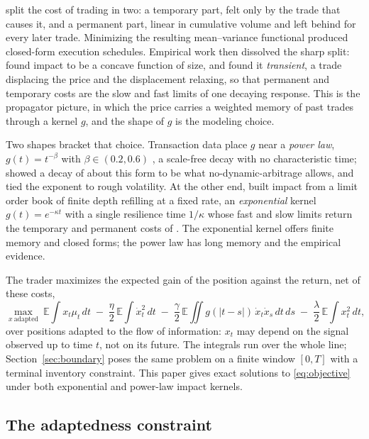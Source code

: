 \documentclass[11pt]{article}
\newcommand{\E}{\mathbb{E}}
\theoremstyle{plain}
\theoremstyle{definition}
\theoremstyle{remark}
\begin{document}
\citet{AlmgrenChriss2001} split the cost of trading in two: a temporary part, felt only by the trade that causes it, and a permanent part, linear in cumulative volume and left behind for every later trade. Minimizing the resulting mean--variance functional produced closed-form execution schedules. Empirical work then dissolved the sharp split: \citet{LilloFarmerMantegna2003} found impact to be a concave function of size, and \citet{BouchaudGefenPottersWyart2004} found it \emph{transient}, a trade displacing the price and the displacement relaxing, so that permanent and temporary costs are the slow and fast limits of one decaying response. This is the propagator picture, in which the price carries a weighted memory of past trades through a kernel $g$, and the shape of $g$ is the modeling choice.

Two shapes bracket that choice. Transaction data place $g$ near a \emph{power law}, $g(t)=t^{-\beta}$ with $\beta\in(0.2,0.6)$ \citep{BouchaudGefenPottersWyart2004,JusselinRosenbaum2020}, a scale-free decay with no characteristic time; \citet{Gatheral2010} showed a decay of about this form to be what no-dynamic-arbitrage allows, and \citet{JusselinRosenbaum2020} tied the exponent to rough volatility. At the other end, \citet{ObizhaevaWang2013} built impact from a limit order book of finite depth refilling at a fixed rate, an \emph{exponential} kernel $g(t)=e^{-\kappa t}$ with a single resilience time $1/\kappa$ whose fast and slow limits return the temporary and permanent costs of \citet{AlmgrenChriss2001}. The exponential kernel offers finite memory and closed forms; the power law has long memory and the empirical evidence.

The trader maximizes the expected gain of the position against the return, net of these costs,
\begin{equation}\label{eq:objective}
\max_{x\ \text{adapted}}\ \E\!\int x_t\mu_t\,dt
\;-\; \frac{\eta}{2}\,\E\!\int \dot x_t^2\,dt
\;-\; \frac{\gamma}{2}\,\E\!\iint g(|t-s|)\,\dot x_t \dot x_s\,dt\,ds
\;-\; \frac{\lambda}{2}\,\E\!\int x_t^2\,dt ,
\end{equation}
over positions adapted to the flow of information: $x_t$ may depend on the signal observed up to time $t$, not on its future. The integrals run over the whole line; Section~\ref{sec:boundary} poses the same problem on a finite window $[0,T]$ with a terminal inventory constraint. This paper gives exact solutions to \eqref{eq:objective} under both exponential and power-law impact kernels.


\subsection{The adaptedness constraint}\label{sec:adaptedness}
\end{document}
